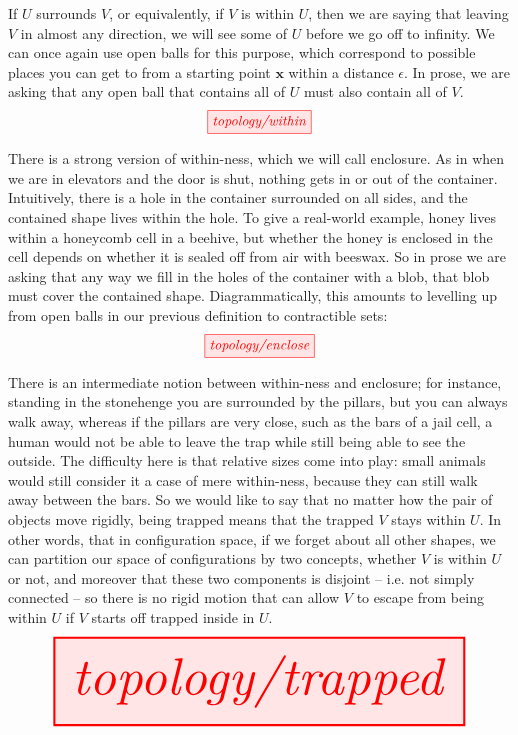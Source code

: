 \begin{myboxB}
\begin{defn}\label{defn:within}
If $U$ surrounds $V$, or equivalently, if $V$ is within $U$, then we are saying that leaving $V$ in almost any direction, we will see some of $U$ before we go off to infinity. We can once again use open balls for this purpose, which correspond to possible places you can get to from a starting point $\mathbf{x}$ within a distance $\epsilon$. In prose, we are asking that any open ball that contains all of $U$ must also contain all of $V$.
\[\tikzfig{topology/within}\]
\end{defn}
\end{myboxB}

\begin{myboxR}
\begin{defn}\label{defn:containment}
There is a strong version of within-ness, which we will call enclosure. As in when we are in elevators and the door is shut, nothing gets in or out of the container. Intuitively, there is a hole in the container surrounded on all sides, and the contained shape lives within the hole. To give a real-world example, honey lives within a honeycomb cell in a beehive, but whether the honey is enclosed in the cell depends on whether it is sealed off from air with beeswax. So in prose we are asking that any way we fill in the holes of the container with a blob, that blob must cover the contained shape. Diagrammatically, this amounts to levelling up from open balls in our previous definition to contractible sets:
\[\tikzfig{topology/enclose}\]
\end{defn}
\end{myboxR}


\begin{myboxB}
\begin{defn}[Trapping]\label{defn:trapped}
There is an intermediate notion between within-ness and enclosure; for instance, standing in the stonehenge you are surrounded by the pillars, but you can always walk away, whereas if the pillars are very close, such as the bars of a jail cell, a human would not be able to leave the trap while still being able to see the outside. The difficulty here is that relative sizes come into play: small animals would still consider it a case of mere within-ness, because they can still walk away between the bars. So we would like to say that no matter how the pair of objects move rigidly, being trapped means that the trapped $V$ stays within $U$. In other words, that in configuration space, if we forget about all other shapes, we can partition our space of configurations by two concepts, whether $V$ is within $U$ or not, and moreover that these two components is disjoint -- i.e. not simply connected -- so there is no rigid motion that can allow $V$ to escape from being within $U$ if $V$ starts off trapped inside in $U$.
\[\resizebox{\textwidth}{!}{\tikzfig{topology/trapped}}\]
\end{defn}
\end{myboxB}

